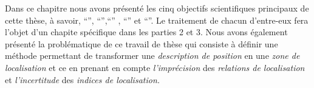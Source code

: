 Dans ce chapitre nous avons présenté les cinq objectifs scientifiques
principaux de cette thèse, à savoir, \enquote{},
\enquote{},\enquote{} ,
\enquote{} et
\enquote{}. Le traitement de chacun d'entre-eux
fera l'objet d'un chapite spécifique dans les parties 2 et 3. Nous
avons également présenté la problématique de ce travail de thèse qui
consiste à définir une méthode permettant de transformer une
\emph{description de position} en une \emph{zone de localisation} et
ce en prenant en compte \emph{l'imprécision} des \emph{relations de
  localisation} et \emph{l'incertitude} des \emph{indices de
  localisation.}

